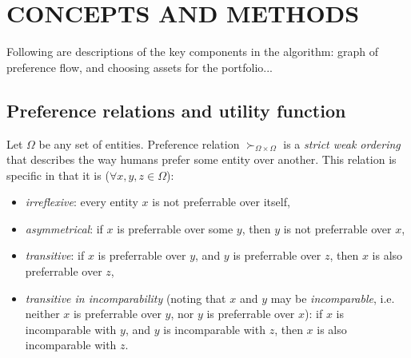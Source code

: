 \documentclass[letterpaper, 10 pt, conference]{ieeeconf}
\begin{document}
  
  
  
  \section{CONCEPTS AND METHODS}
  
  Following are descriptions of the key components in the algorithm: graph of preference flow, and choosing assets for the portfolio...
  
  \subsection{Preference relations and utility function}
  
  Let $\Omega$ be any set of entities.
  Preference relation $\succ_{\Omega \times \Omega}$ is a \textit{strict weak ordering} that describes the way humans prefer some entity over another.
  This relation is specific in that it is ($\forall x, y, z \in \Omega$):
  \begin{itemize}
    \item \textit{irreflexive}: every entity $x$ is not preferrable over itself, %
    \item \textit{asymmetrical}: if $x$ is preferrable over some $y$, then $y$ is not preferrable over $x$, %
    \item \textit{transitive}: if $x$ is preferrable over $y$, and $y$ is preferrable over $z$, then $x$ is also preferrable over $z$, %
    \item \textit{transitive in incomparability} (noting that $x$ and $y$ may be \textit{incomparable}, i.e. neither $x$ is preferrable over $y$, nor $y$ is preferrable over $x$): if $x$ is incomparable with $y$, and $y$ is incomparable with $z$, then $x$ is also incomparable with $z$.
  \end{itemize}
\end{document}
